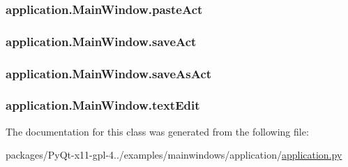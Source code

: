 \subsubsection[{paste\+Act}]{\setlength{\rightskip}{0pt plus 5cm}application.\+Main\+Window.\+paste\+Act}\label{classapplication_1_1MainWindow_a9f491620232dbc81e1e5e2e43463bc7d}
\hypertarget{classapplication_1_1MainWindow_aa825ec3b5b3c280e222514b04557bad6}{}
\subsubsection[{save\+Act}]{\setlength{\rightskip}{0pt plus 5cm}application.\+Main\+Window.\+save\+Act}\label{classapplication_1_1MainWindow_aa825ec3b5b3c280e222514b04557bad6}
\hypertarget{classapplication_1_1MainWindow_a2e582129ceb46ce1529007eb26917d45}{}
\subsubsection[{save\+As\+Act}]{\setlength{\rightskip}{0pt plus 5cm}application.\+Main\+Window.\+save\+As\+Act}\label{classapplication_1_1MainWindow_a2e582129ceb46ce1529007eb26917d45}
\hypertarget{classapplication_1_1MainWindow_a4ba2721ae25435eb6dc32eb851d0d501}{}
\subsubsection[{text\+Edit}]{\setlength{\rightskip}{0pt plus 5cm}application.\+Main\+Window.\+text\+Edit}\label{classapplication_1_1MainWindow_a4ba2721ae25435eb6dc32eb851d0d501}


The documentation for this class was generated from the following file\+:\begin{DoxyCompactItemize}
\item 
packages/\+Py\+Qt-\/x11-\/gpl-\/4../examples/mainwindows/application/\hyperlink{application_8py}{application.\+py}\end{DoxyCompactItemize}
